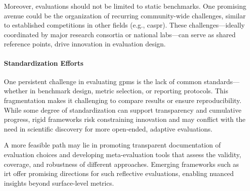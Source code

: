 Moreover, evaluations should not be limited to static benchmarks.
One promising avenue could be the organization of recurring community-wide challenges, similar to established competitions in other fields (e.g., \gls{caspr}\autocite{Moult2005}). These challenges---ideally coordinated by major research consortia or national labs---can serve as shared reference points, drive innovation in evaluation design.

\paragraph{Standardization Efforts} One persistent challenge in evaluating \glspl{gpm} is the lack of common standards---whether in benchmark design, metric selection, or reporting protocols. This fragmentation makes it challenging to compare results or ensure reproducibility. 
While some degree of standardization can support transparency and cumulative progress, rigid frameworks risk constraining innovation and may conflict with the need in scientific discovery for more open-ended, adaptive evaluations. 

A more feasible path may lie in promoting transparent documentation of evaluation choices and developing meta-evaluation tools that assess the validity, coverage, and robustness of different approaches. Emerging frameworks such as \gls{irt} offer promising directions for such reflective evaluations, enabling nuanced insights beyond surface-level metrics. \autocite{schilling2025lifting}

